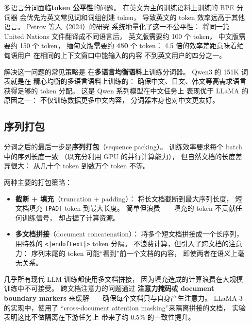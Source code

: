 多语言分词面临\textbf{token 公平性}的问题。
在英文为主的训练语料上训练的 BPE 分词器
会优先为英文常见词和词组创建 token，
导致英文的 token 效率远高于其他语言。
Petrov 等人（2024）的研究%
系统地量化了这一不公平性：
将同一篇 United Nations 文件翻译成不同语言后，
英文版需要约 100 个 token，
中文版需要约 150 个 token，
缅甸文版需要约 \textbf{450} 个 token：
4.5 倍的效率差距意味着缅甸语用户
在相同的上下文窗口中能输入的内容
不到英文用户的四分之一。

解决这一问题的常见策略是
在\textbf{多语言均衡语料}上训练分词器。
Qwen3 的 151K 词表就是在
精心均衡的多语言语料上训练的：
确保中文、日文、韩文等高需求语言
获得足够的 token 分配。
这是 Qwen 系列模型在中文任务上
表现优于 LLaMA 的原因之一：
不仅训练数据更多中文内容，
分词器本身也对中文更友好。

\subsection{序列打包}

分词之后的最后一步是\textbf{序列打包}（sequence packing）。
训练效率要求每个 batch 中的序列长度一致
（以充分利用 GPU 的并行计算能力），
但自然文档的长度差异很大：
从几十个 token 到数万个 token 不等。

两种主要的打包策略：
\begin{itemize}[noitemsep]
  \item \textbf{截断 + 填充}（truncation + padding）：
        将长文档截断到最大序列长度，
        短文档填充 \texttt{[PAD]} token 到最大长度。
        简单但浪费——填充的 token
        不贡献任何训练信号，
        却占据了计算资源。
  \item \textbf{多文档拼接}（document concatenation）：
        将多个短文档拼接成一个长序列，
        用特殊的 \texttt{<|endoftext|>} token 分隔。
        不浪费计算，但引入了跨文档的注意力：
        序列末尾的 token 可能“看到”前一个文档的内容，
        即使两者在语义上毫无关系。
\end{itemize}

几乎所有现代 LLM 训练都使用多文档拼接，
因为填充造成的计算浪费在大规模训练中不可接受。
跨文档注意力的问题通过
\textbf{注意力掩码}或 \textbf{document boundary markers}
来缓解——确保每个文档只与自身产生注意力。
LLaMA 3 的实现中，使用了
“cross-document attention masking”来隔离拼接的文档，
实验表明这比不做隔离在下游任务上
带来了约 0.5\% 的一致性提升。

